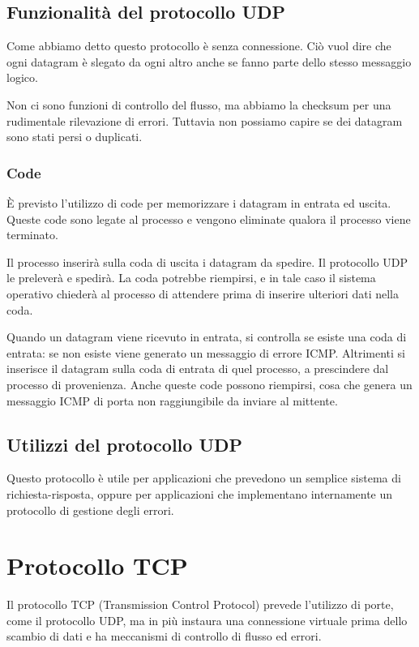     \subsection{Funzionalità del protocollo UDP}
        Come abbiamo detto questo protocollo è senza connessione. Ciò vuol dire che ogni datagram è slegato da ogni altro anche se fanno parte dello stesso messaggio logico.
        
        Non ci sono funzioni di controllo del flusso, ma abbiamo la checksum per una rudimentale rilevazione di errori. Tuttavia non possiamo capire se dei datagram sono stati persi o duplicati.
        
        \subsubsection{Code}
            È previsto l'utilizzo di code per memorizzare i datagram in entrata ed uscita. Queste code sono legate al processo e vengono eliminate qualora il processo viene terminato.
            
            Il processo inserirà sulla coda di uscita i datagram da spedire. Il protocollo UDP le preleverà e spedirà. La coda potrebbe riempirsi, e in tale caso il sistema operativo chiederà al processo di attendere prima di inserire ulteriori dati nella coda.
            
            Quando un datagram viene ricevuto in entrata, si controlla se esiste una coda di entrata: se non esiste viene generato un messaggio di errore ICMP. Altrimenti si inserisce il datagram sulla coda di entrata di quel processo, a prescindere dal processo di provenienza. Anche queste code possono riempirsi, cosa che genera un messaggio ICMP di porta non raggiungibile da inviare al mittente.
            
    \subsection{Utilizzi del protocollo UDP}
        Questo protocollo è utile per applicazioni che prevedono un semplice sistema di richiesta-risposta, oppure per applicazioni che implementano internamente un protocollo di gestione degli errori.
        
\section{Protocollo TCP}
    Il protocollo TCP (Transmission Control Protocol) prevede l'utilizzo di porte, come il protocollo UDP, ma in più instaura una connessione virtuale prima dello scambio di dati e ha meccanismi di controllo di flusso ed errori.
    
